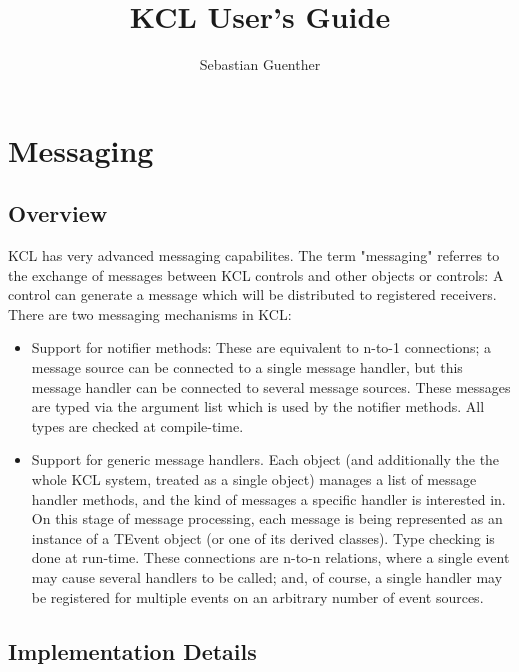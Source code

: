 \documentclass{report}
\begin{document}
\author{Sebastian Guenther}
\title{KCL User's Guide}
\maketitle
\tableofcontents

\chapter{Messaging}


\section{Overview}
KCL has very advanced messaging capabilites. The term "messaging" referres to
the exchange of messages between KCL controls and other objects or controls: A
control can generate a message which will be distributed to registered
receivers.
There are two messaging mechanisms in KCL:
\begin{itemize}
\item Support for notifier methods: These are equivalent to n-to-1 connections;
      a message source can be connected to a single message handler, but this
      message handler can be connected to several message sources.
      \newline These messages are typed via the argument list which is used by
      the notifier methods. All types are checked at compile-time.
\item Support for generic message handlers. Each object (and additionally the
      the whole KCL system, treated as a single object) manages a list of
      message handler methods, and the kind of messages a specific handler is
      interested in.
      \newline On this stage of message processing, each message is being
      represented as an instance of a TEvent object (or one of its derived
      classes). Type checking is done at run-time. These connections are
      n-to-n relations, where a single event may cause several handlers to
      be called; and, of course, a single handler may be registered for
      multiple events on an arbitrary number of event sources.
\end{itemize}

\section{Implementation Details}
\end{document}
